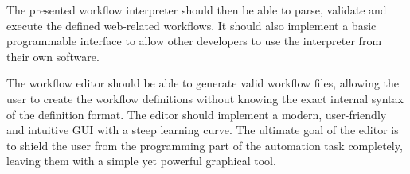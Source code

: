 The presented workflow interpreter should then be able to parse, validate and execute the defined web-related workflows. 
It should also implement a basic programmable interface to allow other developers to use the interpreter from their own software.
\par
The workflow editor should be able to generate valid workflow files, allowing the user to create the workflow definitions without knowing the exact internal syntax of the definition format.
The editor should implement a modern, user-friendly and intuitive \ac{GUI} with a steep learning curve.
The ultimate goal of the editor is to shield the user from the programming part of the automation task completely, leaving them with a simple yet powerful graphical tool.